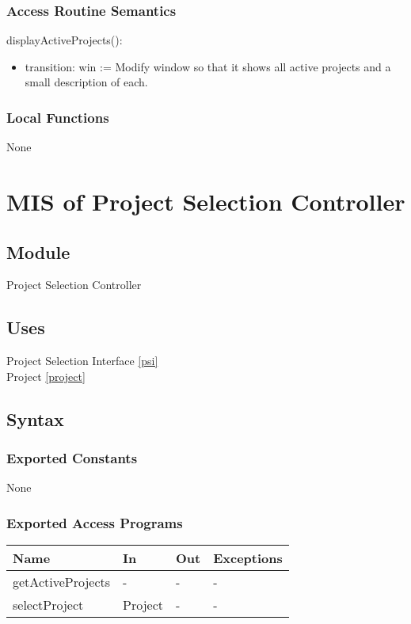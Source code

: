 \documentclass[12pt, titlepage]{article}
\begin{document}
\subsubsection{Access Routine Semantics}

\noindent displayActiveProjects():
\begin{itemize}
\item transition: win := Modify window so that it shows all active projects and a small description of each.
\end{itemize}

\subsubsection{Local Functions}
None

\section{MIS of Project Selection Controller} \label{psc}

\subsection{Module}

Project Selection Controller

\subsection{Uses}

Project Selection Interface \ref{psi}\\
Project \ref{project} \\

\subsection{Syntax}

\subsubsection{Exported Constants}
None
\subsubsection{Exported Access Programs}

\begin{center}
\begin{tabular}{p{4cm} p{4cm} p{4cm} p{2cm}}
\hline
\textbf{Name} & \textbf{In} & \textbf{Out} & \textbf{Exceptions} \\
\hline
getActiveProjects & - & - & - \\
selectProject & Project & - & - \\
\hline
\end{tabular}
\end{center}
\end{document}
